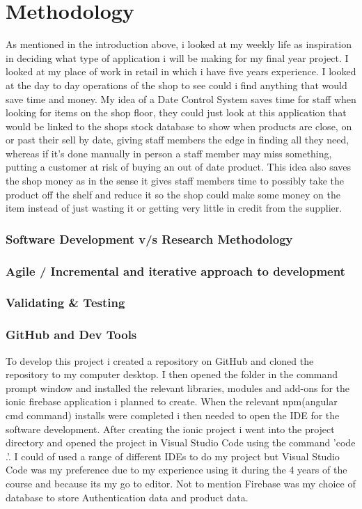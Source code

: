 \chapter{Methodology}
As mentioned in the introduction above, i looked at my weekly life as inspiration in deciding what type of application i will be making for my final year project. I looked at my place of work in retail in which i have five years experience. I looked at the day to day operations of the shop to see could i find anything that would save time and money. My idea of a Date Control System saves time for staff when looking for items on the shop floor, they could just look at this application that would be linked to the shops stock database to show when products are close, on or past their sell by date, giving staff members the edge in finding all they need, whereas if it's done manually in person a staff member may miss something, putting a customer at risk of buying an out of date product. This idea also saves the shop money as in the sense it gives staff members time to possibly take the product off the shelf and reduce it so the shop could make some money on the item instead of just wasting it or getting very little in credit from the supplier.
\newline

\subsection{Software Development v/s Research Methodology}

\subsection{Agile / Incremental and iterative approach to development}

\subsection{Validating \& Testing}

\subsection{GitHub and Dev Tools}
To develop this project i created a repository on GitHub and cloned the repository to my computer desktop. I then opened the folder in the command prompt window and installed the relevant libraries, modules and add-ons for the ionic firebase application i planned to create. When the relevant npm(angular cmd command) installs were completed i then needed to open the IDE for the software development. After creating the ionic project i went into the project directory and opened the project in Visual Studio Code using the command 'code .'. I could of used a range of different IDEs to do my project but Visual Studio Code was my preference due to my experience using it during the 4 years of the course and because its my go to editor. Not to mention Firebase was my choice of database to store Authentication data and product data.